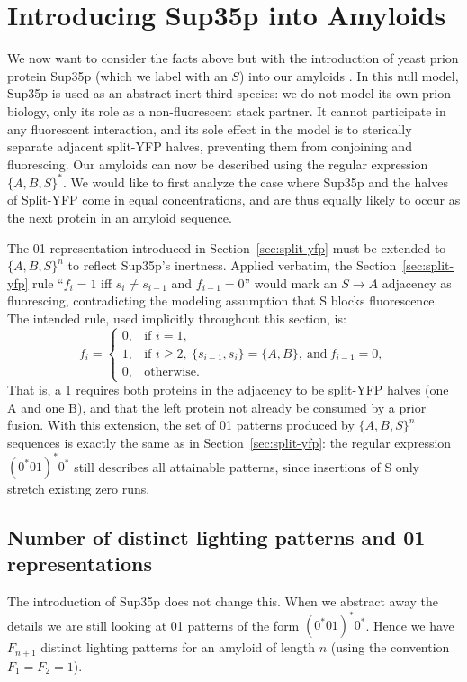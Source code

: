 \documentclass[referee,lineno,pdflatex,sn-mathphys-ay]{sn-jnl}
\begin{document}
\section{Introducing Sup35p into Amyloids}\label{sec:sup35}
We now want to consider the facts above but with the introduction of yeast prion protein Sup35p (which we label with an $S$) into our amyloids \citep{patino1996}. In this null model, Sup35p is used as an abstract inert third species: we do not model its own prion biology, only its role as a non-fluorescent stack partner. It cannot participate in any fluorescent interaction, and its sole effect in the model is to sterically separate adjacent split-YFP halves, preventing them from conjoining and fluorescing. Our amyloids can now be described using the regular expression $\{A,B,S\}^*$. We would like to first analyze the case where Sup35p and the halves of Split-YFP come in equal concentrations, and are thus equally likely to occur as the next protein in an amyloid sequence.

The 01 representation introduced in Section~\ref{sec:split-yfp} must be extended to $\{A, B, S\}^n$ to reflect Sup35p's inertness. Applied verbatim, the Section~\ref{sec:split-yfp} rule ``$f_i = 1$ iff $s_i \neq s_{i-1}$ and $f_{i-1} = 0$'' would mark an $S \to A$ adjacency as fluorescing, contradicting the modeling assumption that S blocks fluorescence. The intended rule, used implicitly throughout this section, is:
\[
f_i = \begin{cases}
0, & \text{if } i = 1, \\
1, & \text{if } i \ge 2,\ \{s_{i-1}, s_i\} = \{A, B\},\ \text{and}\ f_{i-1} = 0, \\
0, & \text{otherwise.}
\end{cases}
\]
That is, a 1 requires both proteins in the adjacency to be split-YFP halves (one A and one B), and that the left protein not already be consumed by a prior fusion. With this extension, the set of 01 patterns produced by $\{A,B,S\}^n$ sequences is exactly the same as in Section~\ref{sec:split-yfp}: the regular expression $(0^*01)^*0^*$ still describes all attainable patterns, since insertions of S only stretch existing zero runs.

\subsection{Number of distinct lighting patterns and 01 representations}
The introduction of Sup35p does not change this. When we abstract away the details we are still looking at 01 patterns of the form $(0^*01)^* 0^*$. Hence we have $F_{n+1}$ distinct lighting patterns for an amyloid of length $n$ (using the convention $F_1 = F_2 = 1$).
\end{document}
